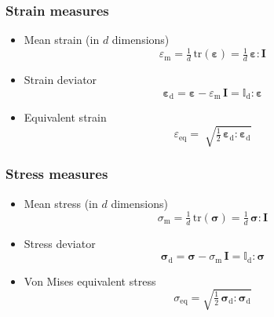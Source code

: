 \documentclass[times,namecite]{goose-article}
\begin{document}
\subsubsection{Strain measures}
\label{sec:nomenclature::strain}

\begin{itemize}
%
\item Mean strain (in $d$ dimensions)
\begin{equation}
  \varepsilon_\mathrm{m}
  = \tfrac{1}{d} \, \mathrm{tr} ( \bm{\varepsilon} )
  = \tfrac{1}{d} \, \bm{\varepsilon} : \bm{I}
\end{equation}
%
\item Strain deviator
\begin{equation}
  \bm{\varepsilon}_\mathrm{d}
  = \bm{\varepsilon} - \varepsilon_\mathrm{m} \, \bm{I}
  = \mathbb{I}_\mathrm{d} : \bm{\varepsilon}
\end{equation}
%
\item Equivalent strain
\begin{equation}
  \varepsilon_\mathrm{eq}
  = \; \sqrt{
    \tfrac{1}{2} \, \bm{\varepsilon}_\mathrm{d} : \bm{\varepsilon}_\mathrm{d}
  }
\end{equation}
%
\end{itemize}

\subsubsection{Stress measures}
\label{sec:nomenclature::stress}

\begin{itemize}
%
\item Mean stress (in $d$ dimensions)
%
\begin{equation}
\sigma_\mathrm{m}
= \tfrac{1}{d} \, \mathrm{tr} ( \bm{\sigma} )
= \tfrac{1}{d} \, \bm{\sigma} : \bm{I}
\end{equation}
%
\item Stress deviator
%
\begin{equation}
  \bm{\sigma}_\mathrm{d}
  = \bm{\sigma} - \sigma_\mathrm{m} \, \bm{I}
  = \mathbb{I}_\mathrm{d} : \bm{\sigma}
\end{equation}
%
\item Von Mises equivalent stress
\begin{equation}
\sigma_\mathrm{eq} = \sqrt{ \tfrac{1}{2} \, \bm{\sigma}_\mathrm{d} : \bm{\sigma}_\mathrm{d} }
\end{equation}
%
\end{itemize}
\end{document}

